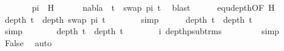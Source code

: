 \begin{isabellebody}
\ \ \ \ \isamarkupfalse%
\ \isamarkupfalse%
\ pi\ \ H{\isacharcolon}{\kern0pt}\isanewline
\ \ \ \ \ \ {\isachardoublequoteopen}nabla\ {\isasymturnstile}\ t{}\ {\isasymapprox}\ swap\ pi\ t{}{\isachardoublequoteclose}\ \isamarkupfalse%
\ blast\isanewline
\isanewline
\ \ \ \ \isamarkupfalse%
\ equ{\isacharunderscore}{\kern0pt}depth{\isacharbrackleft}{\kern0pt}OF\ H{\isacharbrackright}{\kern0pt}\isanewline
\ \ \ \ \isamarkupfalse%
\ {\isachardoublequoteopen}depth\ t{}\ {\isacharequal}{\kern0pt}\ depth\ {\isacharparenleft}{\kern0pt}swap\ pi\ t{}{\isacharparenright}{\kern0pt}{\isachardoublequoteclose}\isanewline
\ \ \ \ \ \ \isamarkupfalse%
\ simp\isanewline
\ \ \ \ \isamarkupfalse%
\ {\isachardoublequoteopen}depth\ t{}\ {\isacharequal}{\kern0pt}\ depth\ t{}{\isachardoublequoteclose}\ \isanewline
\ \ \ \ \ \ \isamarkupfalse%
\ simp\isanewline
\ \ \ \ \isamarkupfalse%
\ \isamarkupfalse%
\ {\isachardoublequoteopen}depth\ t{}\ {\isacharless}{\kern0pt}\ depth\ t{}{\isachardoublequoteclose}\isanewline
\ \ \ \ \ \ \isamarkupfalse%
\ i\ depth{\isacharunderscore}{\kern0pt}psub{\isacharunderscore}{\kern0pt}trms\ \isanewline
\ \ \ \ \ \ \isamarkupfalse%
\ simp\isanewline
\isanewline
\ \ \ \ \isamarkupfalse%
\ \isamarkupfalse%
\ False\ \isamarkupfalse%
\ auto\isanewline
\ \ \isamarkupfalse%
\isanewline
{}\isamarkupfalse%
%
\endisatagproof
{\isafoldproof}%
%
\isadelimproof
\isanewline
%
\endisadelimproof
\isanewline
%
\isadelimtheory
%
\endisadelimtheory
%
\isatagtheory
%
\endisatagtheory
{\isafoldtheory}%
%
\isadelimtheory
%
\endisadelimtheory
%
\end{isabellebody}%
\endinput
